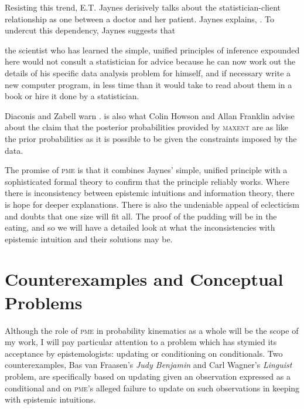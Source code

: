 \documentclass[phd,12pt,oneside]{ubcthesis}
\begin{document}
Resisting this trend, E.T. Jaynes derisively talks about the
statistician-client relationship as one between a doctor and her
patient.  Jaynes explains,  . To
undercut this dependency, Jaynes suggests that

\begin{quotex}
  the scientist who has learned the simple, unified principles of
  inference expounded here would not consult a statistician for advice
  because he can now work out the details of his specific data
  analysis problem for himself, and if necessary write a new computer
  program, in less time than it would take to read about them in a
  book or hire it done by a statistician.
\end{quotex}

Diaconis and Zabell warn 
. 
 is also what Colin Howson and Allan
Franklin advise about the claim that the posterior probabilities
provided by \textsc{maxent} are as like the prior probabilities as it
is possible to be given the constraints imposed by the data.

The promise of \textsc{pme} is that it combines Jaynes' simple,
unified principle with a sophisticated formal theory to confirm that
the principle reliably works. Where there is inconsistency between
epistemic intuitions and information theory, there is hope for deeper
explanations. There is also the undeniable appeal of eclecticism and
doubts that one size will fit all. The proof of the pudding will be in
the eating, and so we will have a detailed look at what the
inconsistencies with epistemic intuition and their solutions may be.

\section{Counterexamples and Conceptual Problems}
\label{sec:ooveisha}

Although the role of \textsc{pme} in probability kinematics as a whole
will be the scope of my work, I will pay particular attention to a
problem which has stymied its acceptance by epistemologists: updating
or conditioning on conditionals. Two counterexamples, Bas van
Fraasen's \emph{Judy Benjamin} and Carl Wagner's \emph{Linguist}
problem, are specifically based on updating given an observation
expressed as a conditional and on \textsc{pme}'s alleged failure to
update on such observations in keeping with epistemic intuitions.
\end{document}
